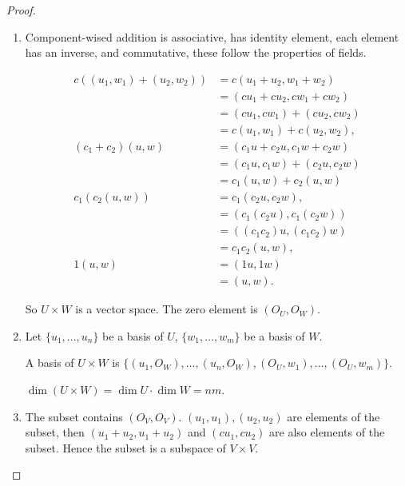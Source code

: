 \begin{proof}
    \begin{enumerate}[label={(\alph*)}]
        \item Component-wised addition is associative, has identity element, each element has an inverse, and commutative, these follow the properties of fields.

              \begin{align*}
                  c((u_{1}, w_{1}) + (u_{2}, w_{2})) & = c(u_{1} + u_{2}, w_{1} + w_{2})     \\
                                                     & = (cu_{1} + cu_{2}, cw_{1} + cw_{2})  \\
                                                     & = (cu_{1}, cw_{1}) + (cu_{2}, cw_{2}) \\
                                                     & = c(u_{1}, w_{1}) + c(u_{2}, w_{2}),  \\
                  (c_{1} + c_{2})(u, w)              & = (c_{1}u + c_{2}u, c_{1}w + c_{2}w)  \\
                                                     & = (c_{1}u, c_{1}w) + (c_{2}u, c_{2}w) \\
                                                     & = c_{1}(u, w) + c_{2}(u, w)           \\
                  c_{1}(c_{2}(u, w))                 & = c_{1}(c_{2}u, c_{2}w),              \\
                                                     & = (c_{1}(c_{2}u), c_{1}(c_{2}w))      \\
                                                     & = ((c_{1}c_{2})u, (c_{1}c_{2})w)      \\
                                                     & = c_{1}c_{2}(u, w),                   \\
                  1(u, w)                            & = (1u, 1w)                            \\
                                                     & = (u, w).
              \end{align*}

              So $U\times W$ is a vector space. The zero element is $(O_{U}, O_{W})$.
        \item Let $\{ u_{1}, \ldots, u_{n} \}$ be a basis of $U$, $\{ w_{1}, \ldots, w_{m} \}$ be a basis of $W$.

              A basis of $U\times W$ is $\{ (u_{1}, O_{W}), \ldots, (u_{n}, O_{W}), (O_{U}, w_{1}), \ldots, (O_{U}, w_{m}) \}$.

              $\dim (U\times W) = \dim U \cdot \dim W = nm$.
        \item The subset contains $(O_{V}, O_{V})$. $(u_{1}, u_{1}), (u_{2}, u_{2})$ are elements of the subset, then $(u_{1} + u_{2}, u_{1} + u_{2})$ and $(cu_{1}, cu_{2})$ are also elements of the subset. Hence the subset is a subspace of $V\times V$.
    \end{enumerate}
\end{proof}

